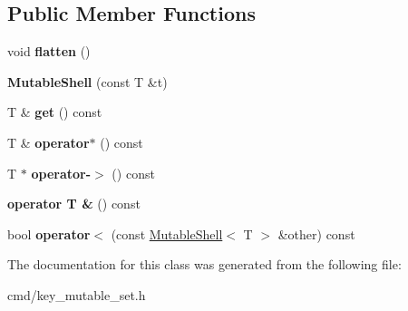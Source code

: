 \subsection*{Public Member Functions}
\begin{DoxyCompactItemize}
\item 
void {\bfseries flatten} ()\hypertarget{classMutableShell_a5b80e05b050b8629b84332e41f819a12}{}\label{classMutableShell_a5b80e05b050b8629b84332e41f819a12}

\item 
{\bfseries Mutable\+Shell} (const T \&t)\hypertarget{classMutableShell_af72a9efbb5c56b5ffcc630eecea1161c}{}\label{classMutableShell_af72a9efbb5c56b5ffcc630eecea1161c}

\item 
T \& {\bfseries get} () const \hypertarget{classMutableShell_a24e949376baebd2b2078fea35772f5d4}{}\label{classMutableShell_a24e949376baebd2b2078fea35772f5d4}

\item 
T \& {\bfseries operator$\ast$} () const \hypertarget{classMutableShell_af40d3ae233b54ba061cb3a9363ce010c}{}\label{classMutableShell_af40d3ae233b54ba061cb3a9363ce010c}

\item 
T $\ast$ {\bfseries operator-\/$>$} () const \hypertarget{classMutableShell_a0a81bbbf806d8682014d975c030e9cc8}{}\label{classMutableShell_a0a81bbbf806d8682014d975c030e9cc8}

\item 
{\bfseries operator T \&} () const \hypertarget{classMutableShell_a7754eba3ee2e130585d459083943d257}{}\label{classMutableShell_a7754eba3ee2e130585d459083943d257}

\item 
bool {\bfseries operator$<$} (const \hyperlink{classMutableShell}{Mutable\+Shell}$<$ T $>$ \&other) const \hypertarget{classMutableShell_aa9ff0559c4d313ac506715fb080ce3e9}{}\label{classMutableShell_aa9ff0559c4d313ac506715fb080ce3e9}

\end{DoxyCompactItemize}


The documentation for this class was generated from the following file\+:\begin{DoxyCompactItemize}
\item 
cmd/key\+\_\+mutable\+\_\+set.\+h\end{DoxyCompactItemize}
